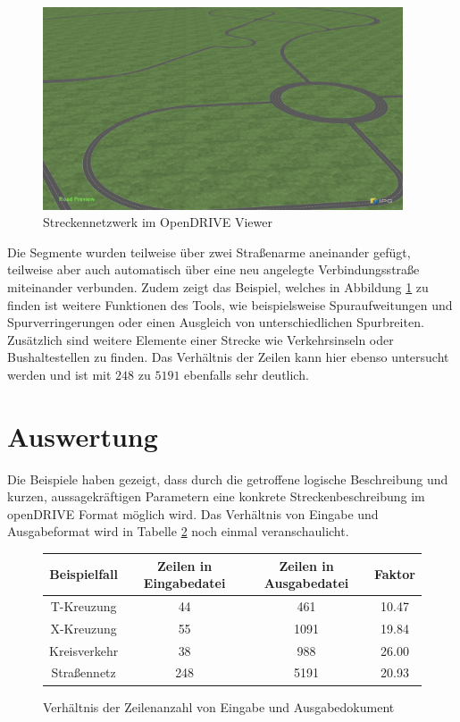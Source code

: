 \begin{figure}[H]
\flushleft
\includegraphics[width=0.95\textwidth]{fig/all.png}
\caption{Streckennetzwerk im OpenDRIVE Viewer}
\label{abb9}
\end{figure}

Die Segmente wurden teilweise über zwei Straßenarme aneinander gefügt, teilweise aber auch automatisch über eine neu angelegte Verbindungsstraße miteinander verbunden. Zudem zeigt das Beispiel, welches in Abbildung \ref{abb9} zu finden ist weitere Funktionen des Tools, wie beispielsweise Spuraufweitungen und Spurverringerungen oder einen Ausgleich von unterschiedlichen Spurbreiten. Zusätzlich sind weitere Elemente einer Strecke wie Verkehrsinseln oder Bushaltestellen zu finden. Das Verhältnis der Zeilen kann hier ebenso untersucht werden und ist mit \(248\) zu \(5191\) ebenfalls sehr deutlich.

\section{Auswertung}

Die Beispiele haben gezeigt, dass durch die getroffene logische Beschreibung und kurzen, aussagekräftigen Parametern eine konkrete Streckenbeschreibung im openDRIVE Format möglich wird. Das Verhältnis von Eingabe und Ausgabeformat wird in Tabelle \ref{tab1} noch einmal veranschaulicht.
\begin{figure}
    \centering
    \begin{tabular}{c|c|c|c}
        \toprule
        \textbf{Beispielfall} & Zeilen in Eingabedatei & Zeilen in Ausgabedatei & Faktor \\
        \midrule
        T-Kreuzung   & 44 & 461  & 10.47\\
        X-Kreuzung   & 55 & 1091 & 19.84\\
        Kreisverkehr & 38 & 988 & 26.00\\
        Straßennetz  & 248 & 5191 & 20.93 \\
        \bottomrule
    \end{tabular}            
    \caption{Verhältnis der Zeilenanzahl von Eingabe und Ausgabedokument}
    \label{tab1}
\end{figure}

